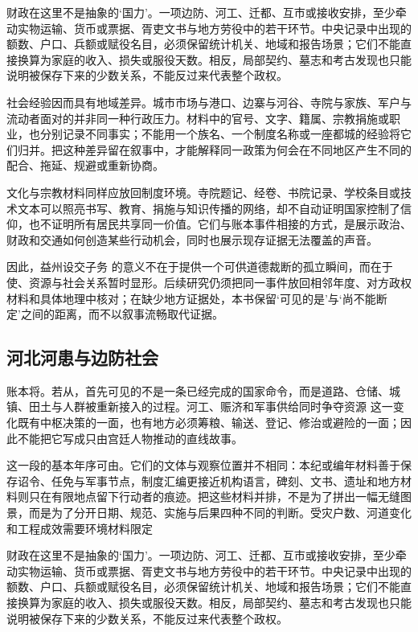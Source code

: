 财政在这里不是抽象的‘国力’。一项边防、河工、迁都、互市或接收安排，至少牵动实物运输、货币或票据、胥吏文书与地方劳役中的若干环节。中央记录中出现的额数、户口、兵额或赋役名目，必须保留统计机关、地域和报告场景；它们不能直接换算为家庭的收入、损失或服役天数。相反，局部契约、墓志和考古发现也只能说明被保存下来的少数关系，不能反过来代表整个政权。

社会经验因而具有地域差异。城市市场与港口、边寨与河谷、寺院与家族、军户与流动者面对的并非同一种行政压力。材料中的官号、文字、籍属、宗教捐施或职业，也分别记录不同事实；不能用一个族名、一个制度名称或一座都城的经验将它们归并。把这种差异留在叙事中，才能解释同一政策为何会在不同地区产生不同的配合、拖延、规避或重新协商。

文化与宗教材料同样应放回制度环境。寺院题记、经卷、书院记录、学校条目或技术文本可以照亮书写、教育、捐施与知识传播的网络，却不自动证明国家控制了信仰，也不证明所有居民共享同一价值。它们与账本事件相接的方式，是展示政治、财政和交通如何创造某些行动机会，同时也展示现存证据无法覆盖的声音。

因此，益州设交子务 的意义不在于提供一个可供道德裁断的孤立瞬间，而在于使、资源与社会关系暂时显形。后续研究仍须把同一事件放回相邻年度、对方政权材料和具体地理中核对；在缺少地方证据处，本书保留‘可见的是’与‘尚不能断定’之间的距离，而不以叙事流畅取代证据。

\subsection{河北河患与边防社会}

账本将。若从，首先可见的不是一条已经完成的国家命令，而是道路、仓储、城镇、田土与人群被重新接入的过程。河工、赈济和军事供给同时争夺资源 这一变化既有中枢决策的一面，也有地方必须筹粮、输送、登记、修治或避险的一面；因此不能把它写成只由宫廷人物推动的直线故事。

这一段的基本年序可由。它们的文体与观察位置并不相同：本纪或编年材料善于保存诏令、任免与军事节点，制度汇编更接近机构语言，碑刻、文书、遗址和地方材料则只在有限地点留下行动者的痕迹。把这些材料并排，不是为了拼出一幅无缝图景，而是为了分开日期、规范、实施与后果四种不同的判断。受灾户数、河道变化和工程成效需要环境材料限定

财政在这里不是抽象的‘国力’。一项边防、河工、迁都、互市或接收安排，至少牵动实物运输、货币或票据、胥吏文书与地方劳役中的若干环节。中央记录中出现的额数、户口、兵额或赋役名目，必须保留统计机关、地域和报告场景；它们不能直接换算为家庭的收入、损失或服役天数。相反，局部契约、墓志和考古发现也只能说明被保存下来的少数关系，不能反过来代表整个政权。

